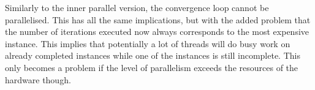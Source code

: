 \newpar
Similarly to the inner parallel version, the convergence loop cannot be parallelised. This has all the same implications, but with the added problem that the number of iterations executed now always corresponds to the most expensive instance. This implies that potentially a lot of threads will do busy work on already completed instances while one of the instances is still incomplete. This only becomes a problem if the level of parallelism exceeds the resources of the hardware though.
